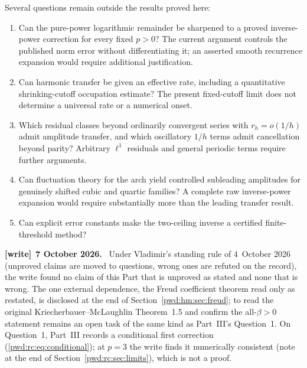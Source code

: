 \documentclass[11pt,letterpaper]{article}
\numberwithin{equation}{section}
\theoremstyle{remark}\newtheorem{remark}[theorem]{Remark}
\newenvironment{writenote}[1][]{\par\smallskip\begingroup\small
 \noindent\textbf{[write]}\if\relax\detokenize{#1}\relax\else~\textbf{#1.}\fi\ }%
 {\par\endgroup\smallskip}
\begin{document}
Several questions remain outside the results proved here:
\begin{enumerate}[leftmargin=1.8em]
 \item Can the pure-power logarithmic remainder be sharpened to a proved inverse-power correction for every fixed $p>0$? The current argument controls the published norm error without differentiating it; an asserted smooth recurrence expansion would require additional justification.
 \item Can harmonic transfer be given an effective rate, including a quantitative shrinking-cutoff occupation estimate? The present fixed-cutoff limit does not determine a universal rate or a numerical onset.
 \item Which residual classes beyond ordinarily convergent series with $r_h=o(1/h)$ admit amplitude transfer, and which oscillatory $1/h$ terms admit cancellation beyond parity? Arbitrary $\ell^1$ residuals and general periodic terms require further arguments.
 \item Can fluctuation theory for the arch yield controlled subleading amplitudes for genuinely shifted cubic and quartic families? A complete raw inverse-power expansion would require substantially more than the leading transfer result.
 \item Can explicit error constants make the two-ceiling inverse a certified finite-threshold method?
\end{enumerate}
\begin{writenote}[7 October 2026]
Under Vladimir's standing rule of 4~October 2026 (unproved claims are moved
to questions, wrong ones are refuted on the record), the write found no claim
of this Part that is unproved as stated and none that is wrong. The one
external dependence, the Freud coefficient theorem read only as restated, is
disclosed at the end of Section~\ref{pwd:hm:sec:freud}; to read the original
Kriecherbauer--McLaughlin Theorem~1.5 and confirm the all-$\beta>0$ statement
remains an open task of the same kind as Part~III's Question~1. On
Question~1, Part~III records a conditional first correction
(\eqref{pwd:rc:eq:conditional}); at $p=3$ the write finds it numerically
consistent (note at the end of Section~\ref{pwd:rc:sec:limits}), which is not
a proof.
\end{writenote}
\end{document}
